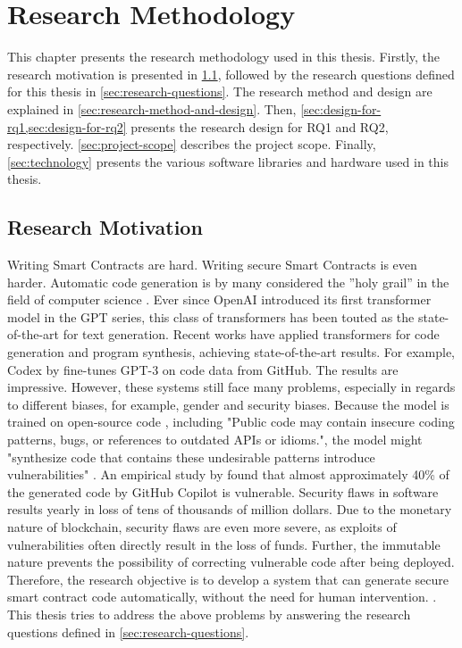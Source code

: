 \chapter{Research Methodology}
\label{chap:method}
This chapter presents the research methodology used in this thesis. Firstly, the research motivation is presented in \cref{sec:research-motivation}, followed by the research questions defined for this thesis in \cref{sec:research-questions}. The research method and design are explained in \cref{sec:research-method-and-design}. Then, \cref{sec:design-for-rq1,sec:design-for-rq2} presents the research design for RQ1 and RQ2, respectively. \cref{sec:project-scope} describes the project scope. Finally, \cref{sec:technology} presents the various software libraries and hardware used in this thesis.

\section{Research Motivation}
\label{sec:research-motivation}
Writing Smart Contracts are hard. Writing secure Smart Contracts is even harder. Automatic code generation is by many considered the ”holy grail” in the field of computer science \cite{PGL-010}. Ever since OpenAI introduced its first transformer model in the GPT series, this class of transformers has been touted as the state-of-the-art for text generation. Recent works have applied transformers for code generation and program synthesis, achieving state-of-the-art results. For example, Codex by \cite{chen2021codex} fine-tunes GPT-3 \cite{brown2020language} on code data from GitHub. The results are impressive. However, these systems still face many problems, especially in regards to different biases, for example, gender and security biases. Because the model is trained on open-source code \cite{chen2021codex}, including "Public code may contain insecure coding patterns, bugs, or references to outdated APIs or idioms.", the model might "synthesize code that contains these undesirable patterns introduce vulnerabilities" \cite{copilot}. An empirical study by \textcite{pearce2021asleep} found that almost approximately 40\% of the generated code by GitHub Copilot is vulnerable. Security flaws in software results yearly in loss of tens of thousands of million dollars. Due to the monetary nature of blockchain, security flaws are even more severe, as exploits of vulnerabilities often directly result in the loss of funds. Further, the immutable nature prevents the possibility of correcting vulnerable code after being deployed. Therefore, the research objective is to develop a system that can generate secure smart contract code automatically, without the need for human intervention. . This thesis tries to address the above problems by answering the research questions defined in \cref{sec:research-questions}.

